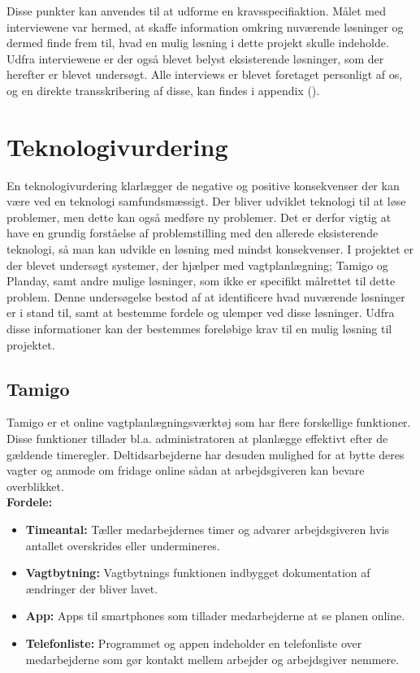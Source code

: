 Disse punkter kan anvendes til at udforme en kravsspecifiaktion. Målet med interviewene var hermed, at skaffe information omkring nuværende løsninger og dermed finde frem til, hvad en mulig løsning i dette projekt skulle indeholde. Udfra interviewene er der også blevet belyst eksisterende løsninger, som der herefter er blevet undersøgt.
Alle interviews er blevet foretaget personligt af os, og en direkte transskribering af disse, kan findes i appendix ().

\section{Teknologivurdering}

En teknologivurdering klarlægger de negative og positive konsekvenser der kan være ved en teknologi samfundsmæssigt. Der bliver udviklet teknologi til at løse problemer, men dette kan også medføre ny problemer. Det er derfor vigtig at have en grundig forståelse af problemstilling med den allerede eksisterende teknologi, så man kan udvikle en løsning med mindst konsekvenser\citep{ProTek}.
I projektet er der blevet undersøgt systemer, der hjælper med vagtplanlægning; Tamigo og Planday, samt andre mulige løsninger, som ikke er specifikt målrettet til dette problem. Denne undersøgelse bestod af at identificere hvad nuværende løsninger er i stand til, samt at bestemme fordele og ulemper ved disse løsninger. Udfra disse informationer kan der bestemmes foreløbige krav til en mulig løsning til projektet.

\subsection{Tamigo}
Tamigo er et online vagtplanlægningsværktøj som har flere forskellige funktioner. Disse funktioner tillader bl.a. administratoren at planlægge effektivt efter de gældende timeregler. Deltidsarbejderne har desuden mulighed for at bytte deres vagter og anmode om fridage online sådan at arbejdsgiveren kan bevare overblikket.\\

\textbf{Fordele: }
\begin{itemize}
\item {\textbf{Timeantal:} Tæller medarbejdernes timer og advarer arbejdsgiveren hvis antallet overskrides eller undermineres.}
\item {\textbf{Vagtbytning:} Vagtbytnings funktionen indbygget dokumentation af ændringer der bliver lavet.}
\item {\textbf{App:} Apps til smartphones som tillader medarbejderne at se planen online.}
\item {\textbf{Telefonliste:} Programmet og appen indeholder en telefonliste over medarbejderne som gør kontakt mellem arbejder og arbejdsgiver nemmere.}\\
\end{itemize}

